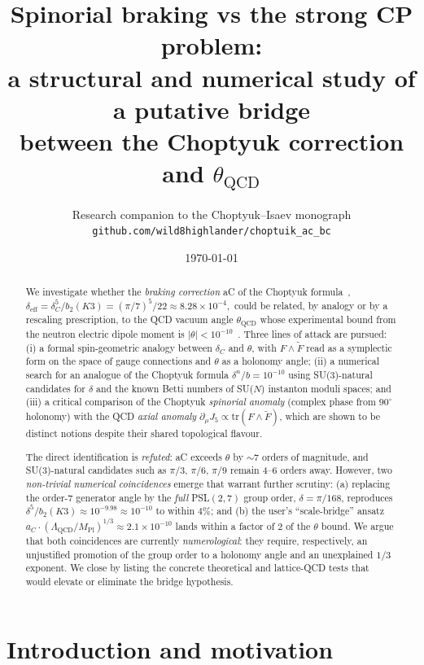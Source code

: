 \documentclass[11pt,a4paper]{article}
\title{\vspace{-1.0cm}\textbf{Spinorial braking vs the strong CP problem:\\
a structural and numerical study of a putative bridge\\
between the Choptyuk \aC{} correction and $\theta_{\mathrm{QCD}}$}}
\author{Research companion to the Choptyuk--Isaev monograph\\
\small\texttt{github.com/wild8highlander/choptuik\_ac\_bc}}
\date{\today}
\newcommand{\dC}{\delta_C}
\newcommand{\aC}{a\text{-}C}
\newcommand{\deff}{\delta_{\mathrm{eff}}}
\newcommand{\LamQ}{\Lambda_{\mathrm{QCD}}}
\newcommand{\MP}{M_{\mathrm{Pl}}}
\renewcommand{\tr}{\mathrm{tr}}
\theoremstyle{plain}
\theoremstyle{definition}
\theoremstyle{remark}
\begin{document}
\maketitle

\begin{abstract}
\noindent
We investigate whether the \emph{braking correction} \aC{} of the Choptyuk
formula~\cite{isaev2024spinor},
\(
\deff = \dC^5 / b_2(K3) = (\pi/7)^5/22 \approx 8.28\times 10^{-4},
\)
could be related, by analogy or by a rescaling prescription, to the
QCD vacuum angle $\theta_{\mathrm{QCD}}$ whose experimental bound from the
neutron electric dipole moment is $|\theta| < 10^{-10}$~\cite{abel2020nEDM}.
Three lines of attack are pursued: (i) a formal spin-geometric analogy
between $\dC$ and $\theta$, with $F\wedge\tilde F$ read as a symplectic
form on the space of gauge connections and $\theta$ as a holonomy angle;
(ii) a numerical search for an analogue of the Choptyuk formula
$\delta^n/b = 10^{-10}$ using SU(3)-natural candidates for $\delta$ and
the known Betti numbers of SU($N$) instanton moduli spaces; and
(iii) a critical comparison of the Choptyuk \emph{spinorial anomaly}
(complex phase from $90^\circ$ holonomy) with the QCD \emph{axial anomaly}
$\partial_\mu J_5 \propto \tr(F\wedge\tilde F)$, which are shown to be
distinct notions despite their shared topological flavour.

The direct identification is \emph{refuted}: \aC{} exceeds $\theta$ by
$\sim 7$ orders of magnitude, and SU(3)-natural candidates such as
$\pi/3$, $\pi/6$, $\pi/9$ remain 4--6 orders away.  However, two
\emph{non-trivial numerical coincidences} emerge that warrant further
scrutiny: (a) replacing the order-$7$ generator angle by the \emph{full}
PSL$(2,7)$ group order, $\delta = \pi/168$, reproduces
$\delta^5/b_2(K3)\approx 10^{-9.98}\approx 10^{-10}$ to within $4\%$;
and (b) the user's ``scale-bridge'' ansatz
$a_C\cdot(\LamQ/\MP)^{1/3}\approx 2.1\times 10^{-10}$ lands within a
factor of $2$ of the $\theta$ bound.  We argue that both coincidences
are currently \emph{numerological}: they require, respectively, an
unjustified promotion of the group order to a holonomy angle and an
unexplained $1/3$ exponent.  We close by listing the concrete
theoretical and lattice-QCD tests that would elevate or eliminate the
bridge hypothesis.
\end{abstract}

\tableofcontents
\bigskip

\section{Introduction and motivation}
\end{document}
